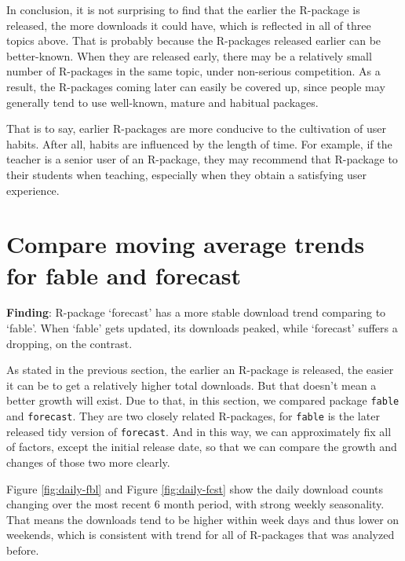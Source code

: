 \documentclass[
]{book}
\newenvironment{discovery}[1]{%
  \begin{tcolorbox}[colback=blue!30,colframe=blue!80!black]#1}{\end{tcolorbox}}
\begin{document}
In conclusion, it is not surprising to find that the earlier the R-package is released, the more downloads it could have, which is reflected in all of three topics above. That is probably because the R-packages released earlier can be better-known. When they are released early, there may be a relatively small number of R-packages in the same topic, under non-serious competition. As a result, the R-packages coming later can easily be covered up, since people may generally tend to use well-known, mature and habitual packages.

That is to say, earlier R-packages are more conducive to the cultivation of user habits. After all, habits are influenced by the length of time. For example, if the teacher is a senior user of an R-package, they may recommend that R-package to their students when teaching, especially when they obtain a satisfying user experience.

\hypertarget{compare-moving-average-trends-for-fable-and-forecast}{%
\section{Compare moving average trends for fable and forecast}\label{compare-moving-average-trends-for-fable-and-forecast}}

\begin{discovery}
\textbf{Finding}: R-package `forecast' has a more stable download trend
comparing to `fable'. When `fable' gets updated, its downloads peaked,
while `forecast' suffers a dropping, on the contrast.
\end{discovery}

As stated in the previous section, the earlier an R-package is released, the easier it can be to get a relatively higher total downloads. But that doesn't mean a better growth will exist. Due to that, in this section, we compared package \texttt{fable} and \texttt{forecast}. They are two closely related R-packages, for \texttt{fable} is the later released tidy version of \texttt{forecast}. And in this way, we can approximately fix all of factors, except the initial release date, so that we can compare the growth and changes of those two more clearly.

Figure \ref{fig:daily-fbl} and Figure \ref{fig:daily-fcst} show the daily download counts changing over the most recent 6 month period, with strong weekly seasonality. That means the downloads tend to be higher within week days and thus lower on weekends, which is consistent with trend for all of R-packages that was analyzed before.
\end{document}

